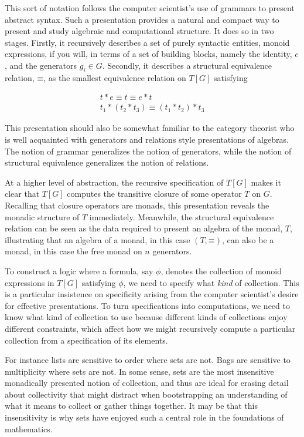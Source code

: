\documentclass[]{acm_proc_article-sp}
\newcommand{\scong}{\mathbin{\equiv}}
\numberwithin{equation}{subsection}
\begin{document}
This sort of notation follows the computer scientist's use of grammars
to present abstract syntax. Such a presentation provides a natural and
compact way to present and study algebraic and computational
structure. It does so in two stages. Firstly, it recursively describes
a set of purely syntactic entities, monoid expressions, if you will,
in terms of a set of building blocks, namely the identity, $e$, and
the generators $g_i \in G$. Secondly, it describes a structural
equivalence relation, $\scong$, as the smallest equivalence relation
on $T[G]$ satisfying

\begin{equation*}
  \begin{aligned}
    t * e \scong t \scong e * t \\
    t_1 * ( t_2 * t_3 ) \scong ( t_1 * t_2 ) * t_3
  \end{aligned}
\end{equation*}

This presentation should also be somewhat familiar to the category
theorist who is well acquainted with generators and relations style
presentations of algebras. The notion of grammar generalizes the
notion of generators, while the notion of structural equivalence
generalizes the notion of relations.

At a higher level of abstraction, the recursive specification of
$T[G]$ makes it clear that $T[G]$ computes the transitive closure of
some operator $T$ on $G$. Recalling that closure operators are monads,
this presentation reveals the monadic structure of $T$
immediately. Meanwhile, the structural equivalence relation can be
seen as the data required to present an algebra of the monad, $T$,
illustrating that an algebra of a monad, in this case $(T,\scong)$,
can also be a monad, in this case the free monad on $n$ generators.

To construct a logic where a formula, say $\phi$, denotes the
collection of monoid expressions in $T[G]$ satisfying $\phi$, we need
to specify what \emph{kind} of collection. This is a particular
insistence on specificity arising from the computer scientist's desire
for effective presentations. To turn specifications into computations,
we need to know what kind of collection to use because different kinds
of collections enjoy different constraints, which affect how we might
recursively compute a particular collection from a specification of
its elements.

For instance lists are sensitive to order where sets are not. Bags are
sensitive to multiplicity where sets are not. In some sense, sets are
the most insensitive monadically presented notion of collection, and
thus are ideal for erasing detail about collectivity that might
distract when bootstrapping an understanding of what it means to
collect or gather things together. It may be that this insensitivity
is why sets have enjoyed such a central role in the foundations of
mathematics.
\end{document}
